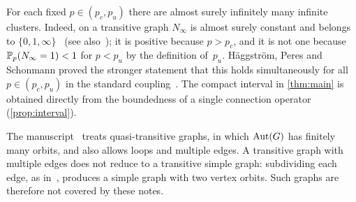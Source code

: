 \begin{remark}\label{rem:fixed-p}
For each fixed $p\in(p_c,p_u)$ there are almost surely infinitely many infinite clusters. Indeed, on a
transitive graph $N_\infty$ is almost surely constant and belongs to $\{0,1,\infty\}$~\cite{NS81}
(see also~\cite[Chapter~7]{LP16}); it is positive because $p>p_c$, and it is not one because
$\mathbb P_p(N_\infty=1)<1$ for $p<p_u$ by the definition of~$p_u$. H\"aggstr\"om, Peres and Schonmann proved
the stronger statement that this holds simultaneously for all $p\in(p_c,p_u)$ in the standard
coupling~\cite{HPS99}. The compact interval in \cref{thm:main} is obtained directly from the
boundedness of a single connection operator (\cref{prop:interval}).
\end{remark}

\begin{remark}[Scope]\label{rem:scope}
The manuscript~\cite{Ope26} treats quasi-transitive graphs, in which $\operatorname{Aut}(G)$ has finitely many
orbits, and also allows loops and multiple edges. A transitive graph with multiple edges does not
reduce to a transitive simple graph: subdividing each edge, as in~\cite{Ope26}, produces a simple
graph with two vertex orbits. Such graphs are therefore not covered by these notes.
\end{remark}
